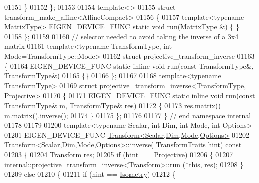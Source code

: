 \begin{DoxyCode}
01151   \}
01152 \};
01153 
01154 \textcolor{keyword}{template}<>
01155 \textcolor{keyword}{struct }transform\_make\_affine<AffineCompact>
01156 \{
01157   \textcolor{keyword}{template}<\textcolor{keyword}{typename} MatrixType> EIGEN\_DEVICE\_FUNC \textcolor{keyword}{static} \textcolor{keywordtype}{void} run(MatrixType &) \{ \}
01158 \};
01159     
01160 \textcolor{comment}{// selector needed to avoid taking the inverse of a 3x4 matrix}
01161 \textcolor{keyword}{template}<\textcolor{keyword}{typename} TransformType, \textcolor{keywordtype}{int} Mode=TransformType::Mode>
01162 \textcolor{keyword}{struct }projective\_transform\_inverse
01163 \{
01164   EIGEN\_DEVICE\_FUNC \textcolor{keyword}{static} \textcolor{keyword}{inline} \textcolor{keywordtype}{void} run(\textcolor{keyword}{const} TransformType&, TransformType&)
01165   \{\}
01166 \};
01167 
01168 \textcolor{keyword}{template}<\textcolor{keyword}{typename} TransformType>
01169 \textcolor{keyword}{struct }projective\_transform\_inverse<TransformType, Projective>
01170 \{
01171   EIGEN\_DEVICE\_FUNC \textcolor{keyword}{static} \textcolor{keyword}{inline} \textcolor{keywordtype}{void} run(\textcolor{keyword}{const} TransformType& m, TransformType& res)
01172   \{
01173     res.matrix() = m.matrix().inverse();
01174   \}
01175 \};
01176 
01177 \} \textcolor{comment}{// end namespace internal}
01178 
01179 
01200 \textcolor{keyword}{template}<\textcolor{keyword}{typename} Scalar, \textcolor{keywordtype}{int} Dim, \textcolor{keywordtype}{int} Mode, \textcolor{keywordtype}{int} Options>
01201 EIGEN\_DEVICE\_FUNC \hyperlink{group___geometry___module_class_eigen_1_1_transform}{Transform<Scalar,Dim,Mode,Options>}
01202 \hyperlink{group___geometry___module_a20ca137b84f18b9c41a0fef9c222e0da}{Transform<Scalar,Dim,Mode,Options>::inverse}(
      \hyperlink{group__enums_gaee59a86102f150923b0cac6d4ff05107}{TransformTraits} hint)\textcolor{keyword}{ const}
01203 \textcolor{keyword}{}\{
01204   \hyperlink{group___geometry___module_class_eigen_1_1_transform}{Transform} res;
01205   \textcolor{keywordflow}{if} (hint == \hyperlink{group__enums_ggaee59a86102f150923b0cac6d4ff05107aead6a2de12a17aaa4f5c523215dfccad}{Projective})
01206   \{
01207     \hyperlink{struct_eigen_1_1internal_1_1projective__transform__inverse}{internal::projective\_transform\_inverse<Transform>::run}
      (*\textcolor{keyword}{this}, res);
01208   \}
01209   \textcolor{keywordflow}{else}
01210   \{
01211     \textcolor{keywordflow}{if} (hint == \hyperlink{group__enums_ggaee59a86102f150923b0cac6d4ff05107a080cd5366173608f701cd945c2335568}{Isometry})
01212     \{

\end{DoxyCode}
